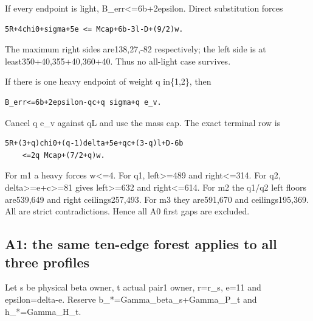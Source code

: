 \documentclass[10pt,a4paper]{article}
\theoremstyle{definition}
\begin{document}
If every endpoint is light,\allowbreak{} B\_\allowbreak{}err\textless=\allowbreak{}6b+\allowbreak{}2epsilon. Direct
substitution forces

\begin{lstlisting}
5R+4chi0+sigma+5e <= Mcap+6b-3l-D+(9/2)w.
\end{lstlisting}

The maximum right sides are138,\allowbreak{}27,\allowbreak{}-82 respectively; the left side is at
least350+\allowbreak{}40,\allowbreak{}355+\allowbreak{}40,\allowbreak{}360+\allowbreak{}40. Thus no all-light case survives.

If there is one heavy endpoint of weight q in\{1,\allowbreak{}2\},\allowbreak{} then

\begin{lstlisting}
B_err<=6b+2epsilon-qc+q sigma+q e_v.
\end{lstlisting}

Cancel q e\_\allowbreak{}v against qL and use the mass cap. The exact terminal row is

\begin{lstlisting}
5R+(3+q)chi0+(q-1)delta+5e+qc+(3-q)l+D-6b
    <=2q Mcap+(7/2+q)w.
\end{lstlisting}

For m1 a heavy forces w\textless=\allowbreak{}4. For q1,\allowbreak{} left\textgreater=\allowbreak{}489 and
right\textless=\allowbreak{}314. For q2,\allowbreak{} delta\textgreater=\allowbreak{}e+\allowbreak{}c\textgreater=\allowbreak{}81 gives
left\textgreater=\allowbreak{}632 and right\textless=\allowbreak{}614. For m2 the q1/q2 left
floors are539,\allowbreak{}649 and right ceilings257,\allowbreak{}493. For m3 they are591,\allowbreak{}670 and
ceilings195,\allowbreak{}369. All are strict contradictions. Hence all A0 first gaps
are excluded.

\hypertarget{a1-the-same-ten-edge-forest-applies-to-all-three-profiles}{%
\subsection{A1: the same ten-edge forest applies to all three
profiles}\label{a1-the-same-ten-edge-forest-applies-to-all-three-profiles}}

Let s be physical beta owner,\allowbreak{} t actual pair1 owner,\allowbreak{} r=\allowbreak{}r\_\allowbreak{}s,\allowbreak{} e=\allowbreak{}11 and
epsilon=\allowbreak{}delta-e. Reserve b\_\allowbreak{}*=\allowbreak{}Gamma\_\allowbreak{}beta\_\allowbreak{}s+\allowbreak{}Gamma\_\allowbreak{}P\_\allowbreak{}t and
h\_\allowbreak{}*=\allowbreak{}Gamma\_\allowbreak{}H\_\allowbreak{}t.
\end{document}
